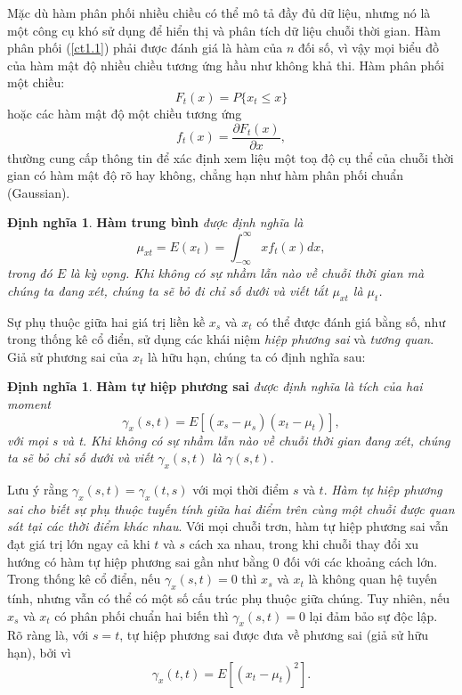 \documentclass[12pt, a4paper,oneside]{book}
\theoremstyle{definition}
\newtheorem{dn}[theo]{Định nghĩa}
\begin{document}
Mặc dù hàm phân phối nhiều chiều có thể mô tả đầy đủ dữ liệu, nhưng nó là một công cụ khó sử dụng để hiển thị và phân tích dữ liệu chuỗi thời gian. Hàm phân phối (\ref{ct1.1}) phải được đánh giá là hàm của $n$ đối số, vì vậy mọi biểu đồ của hàm mật độ nhiều chiều tương ứng hầu như không khả thi. Hàm phân phối một chiều:
\begin{equation}
{F}_{t}(x)= {P}\{x_{t}\leq x\} \label{ct1.4}
\end{equation}
hoặc các hàm mật độ một chiều tương ứng 
\begin{equation}
{f}_{t}(x)= \dfrac{\partial{F}_{t}(x)}{\partial x}, \label{ct1.5}
\end{equation}
thường cung cấp thông tin để xác định xem liệu một toạ độ cụ thể của chuỗi thời gian có hàm mật độ rõ hay không, chẳng hạn như hàm phân phối chuẩn (Gaussian).
\begin{dn}\cite{1} \textbf{Hàm trung bình} \textit{được định nghĩa là
\begin{equation}
\mu_{xt} = E(x_{t}) =  \int_{-\infty}^{\infty} xf_{t}(x) dx, \label{ct1.6}
\end{equation}
trong đó $E$ là kỳ vọng. Khi không có sự nhầm lẫn nào về chuỗi thời gian mà chúng ta đang xét, chúng ta sẽ bỏ đi chỉ số dưới và viết tắt $\mu_{xt}$ là $\mu_{t}$.}
\end{dn}

Sự phụ thuộc giữa hai giá trị liền kề $x_{s}$ và $x_{t}$ có thể được đánh giá bằng số, như trong thống kê cổ điển, sử dụng các khái niệm \textit{hiệp phương sai} và \textit{tương quan}. Giả sử phương sai của $x_{t}$ là hữu hạn, chúng ta có định nghĩa sau:
\begin{dn}\cite{1} \textbf{Hàm tự hiệp phương sai} \textit{được định nghĩa là tích của hai moment
\begin{equation}
\gamma_{x}(s,t) =E[(x_{s}-\mu_{s})(x_{t}-\mu_{t})], \label{ct1.11}
\end{equation}
với mọi s và t. Khi không có sự nhầm lẫn nào về chuỗi thời gian đang xét, chúng ta sẽ bỏ chỉ số dưới và viết $\gamma_{x}(s,t)$ là $ \gamma(s,t).$}
\end{dn}

Lưu ý rằng $\gamma_{x}(s,t) =\gamma_{x}(t,s)$ với mọi thời điểm $s$ và $t$. \textit{Hàm tự hiệp phương sai cho biết sự phụ thuộc tuyến tính giữa hai điểm trên cùng một chuỗi được quan sát tại các thời điểm khác nhau}. Với mọi chuỗi trơn, hàm tự hiệp phương sai vẫn đạt giá trị lớn ngay cả khi $t$ và $s$ cách xa nhau, trong khi chuỗi thay đổi xu hướng có hàm tự hiệp phương sai  gần như bằng 0 đối với các khoảng cách lớn. Trong thống kê cổ điển, nếu $\gamma_{x} (s,t)= 0$ thì $x_{s}$ và $x_{t}$ là không quan hệ tuyến tính, nhưng vẫn có thể có một số cấu trúc phụ thuộc giữa chúng. Tuy nhiên, nếu $x_{s}$ và $x_{t}$ có phân phối chuẩn hai biến thì $\gamma_{x}(s,t) = 0$ lại đảm bảo sự độc lập. Rõ ràng là, với $s = t$, tự hiệp phương sai được đưa về phương sai (giả sử hữu hạn), bởi vì
\begin{equation}
\gamma_{x}(t,t) = E [(x_{t}- \mu_{t})^2]. \label{ct1.12}
\end{equation}
\end{document}
